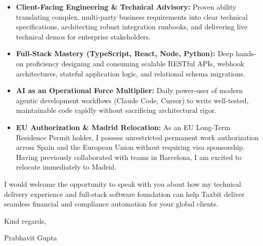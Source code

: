 \documentclass[11pt,a4paper]{article}
\begin{document}
\begin{itemize}[leftmargin=*]
    \item \textbf{Client-Facing Engineering \& Technical Advisory:} Proven ability translating complex, multi-party business requirements into clear technical specifications, architecting robust integration runbooks, and delivering live technical demos for enterprise stakeholders.
    \item \textbf{Full-Stack Mastery (TypeScript, React, Node, Python):} Deep hands-on proficiency designing and consuming scalable RESTful APIs, webhook architectures, stateful application logic, and relational schema migrations.
    \item \textbf{AI as an Operational Force Multiplier:} Daily power-user of modern agentic development workflows (Claude Code, Cursor) to write well-tested, maintainable code rapidly without sacrificing architectural rigor.
    \item \textbf{EU Authorization \& Madrid Relocation:} As an EU Long-Term Residence Permit holder, I possess unrestricted permanent work authorization across Spain and the European Union without requiring visa sponsorship. Having previously collaborated with teams in Barcelona, I am excited to relocate immediately to Madrid.
\end{itemize}

\noindent I would welcome the opportunity to speak with you about how my technical delivery experience and full-stack software foundation can help Taxbit deliver seamless financial and compliance automation for your global clients.

\vspace{8pt}

\noindent Kind regards,

\vspace{8pt}

\noindent Prabhavit Gupta
\end{document}
